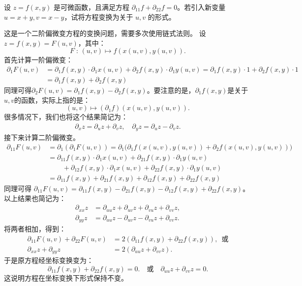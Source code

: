 \documentclass[12pt,UTF8,fontset=none]{ctexbook}
\begin{document}
\begin{et}
设 $z = f(x, y)$ 是可微函数，且满足方程 $\partial_{11} f + \partial_{22} f = 0$。若引入新变量 $u = x + y, v = x - y$，试将方程变换为关于 $u, v$ 的形式。
\end{et}
\begin{so}
这是一个二阶偏微变方程的变换问题，需要多次使用链式法则。
设$z = f(x,y) = F(u,v)$，其中：
$$ F\;:\, (u,v) \mapsto f(x(u,v),y(u,v)). $$
首先计算一阶偏微变：
\begin{align*}
    \partial_1 F(u,v) &= \partial_1 f(x,y)\cdot \partial_1 x(u,v) + \partial_2 f(x,y)\cdot \partial_1 y(u,v) =  \partial_1 f(x,y) \cdot 1 +  \partial_2 f(x,y) \cdot 1 \\
    &=  \partial_1 f(x,y) +  \partial_2 f(x,y)
\end{align*}
同理可得$\partial_2 F(u,v) = \partial_1 f(x,y) - \partial_2 f(x,y)$。要注意的是，$\partial_1 f(x,y)$是关于$u,v$的函数，实际上指的是：
$$ (u,v) \mapsto (\partial_1 f)(x(u,v),y(u,v)). $$
很多情况下，我们也将这个结果简记为：
\begin{align*}
\partial_x z = \partial_u z + \partial_v z, \quad \partial_y z = \partial_u z - \partial_v z.
\end{align*}
接下来计算二阶偏微变。
\begin{align*}
\partial_{11} F(u, v) &= \partial_1(\partial_1 F(u,v)) = \partial_1\Big(\partial_1 f(x(u,v),y(u,v)) +  \partial_2 f(x(u,v),y(u,v))\Big) \\
&= \partial_{11} f(x,y)\cdot  \partial_1 x(u,v) + \partial_{21} f(x,y)\cdot  \partial_1 y(u,v) \\
&\phantom{=+}+
 \partial_{12} f(x,y)\cdot  \partial_1 x(u,v) + \partial_{22} f(x,y)\cdot  \partial_1 y(u,v) \\
&=  \partial_{11} f(x,y) + \partial_{21} f(x,y) + \partial_{12} f(x,y) + \partial_{22} f(x,y)
\end{align*}
同理可得 $\partial_{11} F(u, v) = \partial_{11} f(x,y) - \partial_{21} f(x,y) - \partial_{12} f(x,y) + \partial_{22} f(x,y)$。以上结果也简记为：
\begin{align*}
\partial_{xx} z &= \partial_{uu} z + \partial_{uv} z + \partial_{vu} z + \partial_{vv} z, \\
\partial_{yy} z &= \partial_{uu} z - \partial_{uv} z - \partial_{vu} z + \partial_{vv} z.
\end{align*}
将两者相加，得到：
\begin{align*}
    \partial_{11} F(u, v) + \partial_{22} F(u, v) &= 2(\partial_{11} f(x,y) + \partial_{22} f(x,y)), \,\,\,\mbox{或}\\
     \partial_{xx} z + \partial_{yy} z &= 2(\partial_{uu} z + \partial_{vv} z).
\end{align*}
于是原方程经坐标变换变为：
$$ \partial_{11} f(x,y) + \partial_{22} f(x,y) = 0. \quad \mbox{或}\quad \partial_{uu} z + \partial_{vv} z = 0.$$
这说明方程在坐标变换下形式保持不变。
\end{so}
\end{document}

